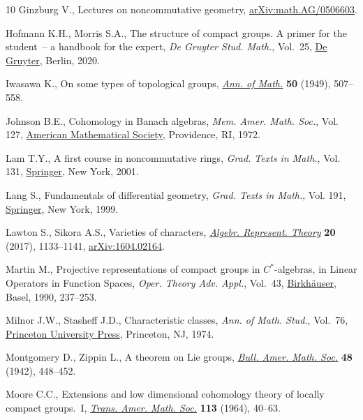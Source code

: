 \documentclass[pdftex]{sigma}
\numberwithin{equation}{section}
\begin{document}
\begin{thebibliography}{10}
Ginzburg V., Lectures on noncommutative geometry, \href{https://arxiv.org/abs/math.AG/0506603}{arXiv:math.AG/0506603}.

Hofmann K.H., Morris S.A., The structure of compact groups. {A} primer for the
 student~-- a handbook for the expert, \textit{De Gruyter Stud. Math.},
 Vol.~25, \href{https://doi.org/10.1515/9783110695991}{De Gruyter}, Berlin, 2020.

Iwasawa K., On some types of topological groups, \href{https://doi.org/10.2307/1969548}{\textit{Ann. of Math.}}
 \textbf{50} (1949), 507--558.

Johnson B.E., Cohomology in {B}anach algebras, \textit{Mem. Amer. Math. Soc.},
 Vol. 127, \href{https://doi.org/10.1090/memo/0127}{American Mathematical Society}, Providence, RI, 1972.

Lam T.Y., A first course in noncommutative rings, \textit{Grad. Texts in
 Math.}, Vol. 131, \href{https://doi.org/10.1007/978-1-4419-8616-0}{Springer}, New York, 2001.

Lang S., Fundamentals of differential geometry, \textit{Grad. Texts in Math.},
 Vol. 191, \href{https://doi.org/10.1007/978-1-4612-0541-8}{Springer}, New York, 1999.

Lawton S., Sikora A.S., Varieties of characters, \href{https://doi.org/10.1007/s10468-017-9679-y}{\textit{Algebr. Represent.
 Theory}} \textbf{20} (2017), 1133--1141, \href{https://arxiv.org/abs/1604.02164}{arXiv:1604.02164}.

Martin M., Projective representations of compact groups in {$C^*$}-algebras, in
 Linear {O}perators in {F}unction {S}paces, \textit{Oper. Theory Adv. Appl.},
 Vol.~43, \href{https://doi.org/10.1007/978-3-0348-7250-8_17}{Birkh\"auser}, Basel, 1990, 237--253.

Milnor J.W., Stasheff J.D., Characteristic classes, \textit{Ann. of Math.
 Stud.}, Vol.~76, \href{https://doi.org/10.1515/9781400881826}{Princeton University Press}, Princeton, NJ, 1974.

Montgomery D., Zippin L., A theorem on {L}ie groups, \href{https://doi.org/10.1090/S0002-9904-1942-07699-3}{\textit{Bull. Amer. Math.
 Soc.}} \textbf{48} (1942), 448--452.

Moore C.C., Extensions and low dimensional cohomology theory of locally compact
 groups.~{I}, \href{https://doi.org/10.2307/1994090}{\textit{Trans. Amer. Math. Soc.}} \textbf{113} (1964), 40--63.


\end{thebibliography}
\end{document}
